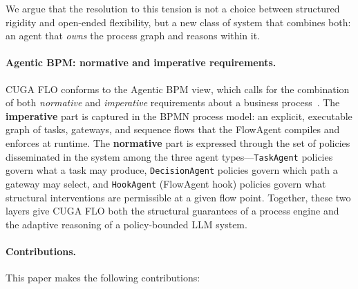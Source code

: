 \documentclass[11pt,a4paper]{article}
\begin{document}
We argue that the resolution to this tension is not a choice between structured
rigidity and open-ended flexibility, but a new class of system that combines both:
an agent that \emph{owns} the process graph and reasons within it.

\paragraph{Agentic BPM: normative and imperative requirements.}
CUGA FLO conforms to the Agentic BPM view, which calls for the combination of
both \emph{normative} and \emph{imperative} requirements about a business
process~\cite{calvanese2026agenticbpm,dumas2023aiaugmented}.
The \textbf{imperative} part is captured in the BPMN process model: an explicit,
executable graph of tasks, gateways, and sequence flows that the FlowAgent
compiles and enforces at runtime.
The \textbf{normative} part is expressed through the set of policies disseminated
in the system among the three agent types---\texttt{TaskAgent} policies govern
what a task may produce, \texttt{DecisionAgent} policies govern which path a
gateway may select, and \texttt{HookAgent} (FlowAgent hook) policies govern what
structural interventions are permissible at a given flow point.
Together, these two layers give CUGA FLO both the structural guarantees of a
process engine and the adaptive reasoning of a policy-bounded LLM system.

\paragraph{Contributions.}
This paper makes the following contributions:
\end{document}
